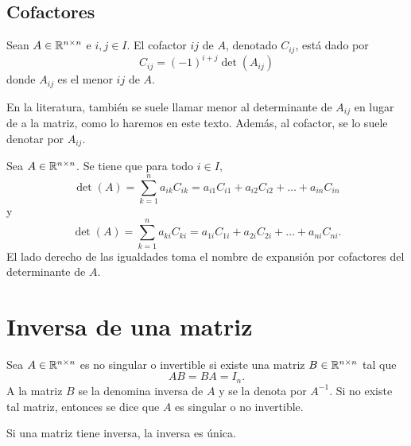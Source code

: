 \documentclass[a4,11pt]{aleph-notas}
\begin{document}
\subsection{Cofactores}

\begin{defi}[Cofactores]
    Sean $A\in \Mat[\R]{n}{n}$ e $i,j\in I$. El cofactor $ij$ de $A$, denotado $C_{ij}$, está dado por
    \[
        C_{ij} = (-1)^{i+j} \det (A_{ij})
    \]
     donde $A_{ij}$ es el menor $ij$ de $A$.
\end{defi}

\begin{advertencia}
    En la literatura, también se suele llamar menor al determinante de $A_{ij}$ en lugar de a la matriz, como lo haremos en este texto. Además, al cofactor, se lo suele denotar por $A_{ij}$.
\end{advertencia}

\begin{teo}
    Sea $A \in \Mat[\R]{n}{n}$. Se tiene que para todo $i\in I$,
    \[
        \det(A) 
        = \sum_{k=1}^n a_{ik}C_{ik} 
        = a_{i1}C_{i1} + a_{i2}C_{i2} + \ldots + a_{in}C_{in}
    \]
    y
    \[
        \det(A) 
        = \sum_{k=1}^n a_{ki}C_{ki} 
        = a_{1i}C_{1i} + a_{2i}C_{2i} + \ldots + a_{ni}C_{ni}.
    \]
    El lado derecho de las igualdades toma el nombre de expansión por cofactores del determinante de $A$.
\end{teo}

\section{Inversa de una matriz}

\begin{defi}
    Sea $A\in \Mat[\R]{n}{n}$ es no singular o invertible si existe una matriz $B\in \Mat[\R]{n}{n}$ tal que 
    \[
        AB = BA = I_n.
    \]
    A la matriz $B$ se la denomina inversa de $A$ y se la denota por $A^{-1}$. Si no existe tal matriz, entonces se dice que $A$ es singular o no invertible. 
\end{defi}

\begin{teo}
    Si una matriz tiene inversa, la inversa es única. 
\end{teo}
\end{document}
